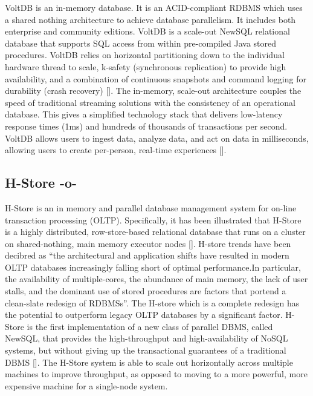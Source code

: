 VoltDB is an in-memory database. It is an ACID-compliant RDBMS which
uses a shared nothing architecture to achieve database parallelism. It
includes both enterprise and community editions. VoltDB is a scale-out
NewSQL relational database that supports SQL access from within
pre-compiled Java stored procedures.  VoltDB relies on horizontal
partitioning down to the individual hardware thread to scale, k-safety
(synchronous replication) to provide high availability, and a
combination of continuous snapshots and command logging for durability
(crash recovery) [\cite{www-voltdb}]. The in-memory, scale-out
architecture couples the speed of traditional streaming solutions with
the consistency of an operational database. This gives a simplified
technology stack that delivers low-latency response times (1ms) and
hundreds of thousands of transactions per second. VoltDB allows users
to ingest data, analyze data, and act on data in milliseconds,
allowing users to create per-person, real-time
experiences [\cite{www-voltdb}].

\subsection{H-Store -o-}

H-Store is an in memory and parallel database management system for
on-line transaction processing (OLTP). Specifically, it has been
illustrated that H-Store is a highly distributed, row-store-based
relational database that runs on a cluster on shared-nothing, main
memory executor nodes [\cite{www-Hstore}].  H-store trends have been
decibred as ``the architectural and application shifts have resulted
in modern OLTP databases increasingly falling short of optimal
performance.In particular, the availability of multiple-cores, the
abundance of main memory, the lack of user stalls, and the dominant
use of stored procedures are factors that portend a clean-slate
redesign of RDBMSs''\cite{kallman2008}.  The H-store which is a
complete redesign has the potential to outperform legacy OLTP
databases by a significant factor.  H-Store is the first
implementation of a new class of parallel DBMS, called NewSQL, that
provides the high-throughput and high-availability of NoSQL systems,
but without giving up the transactional guarantees of a traditional
DBMS [\cite{www-Hstorewiki}]. The H-Store system is able to scale out
horizontally across multiple machines to improve throughput, as
opposed to moving to a more powerful, more expensive machine for a
single-node system.



